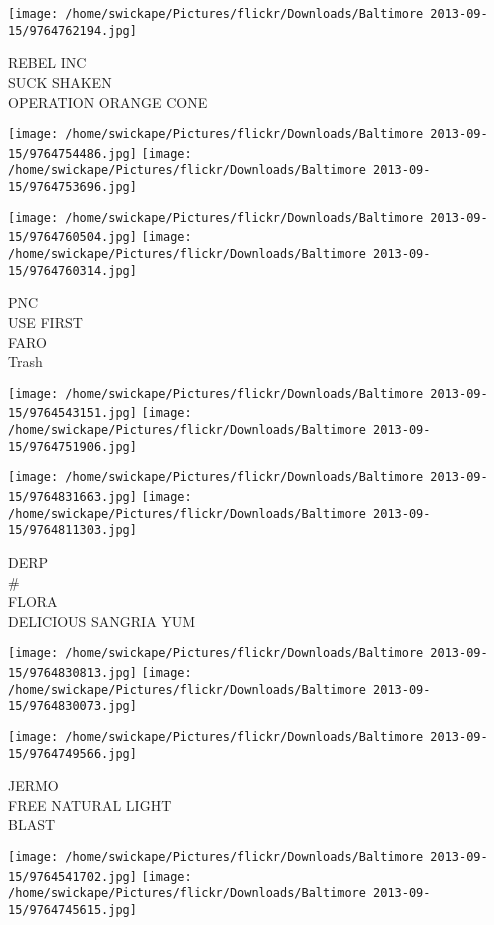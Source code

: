 \documentclass[10pt,letterpaper]{article}
\begin{document}
\vspace{0.25in}
\texttt{[image: /home/swickape/Pictures/flickr/Downloads/Baltimore 2013-09-15/9764762194.jpg]}

REBEL INC\\
SUCK SHAKEN\\
OPERATION ORANGE CONE
\pagebreak

\texttt{[image: /home/swickape/Pictures/flickr/Downloads/Baltimore 2013-09-15/9764754486.jpg]}
\texttt{[image: /home/swickape/Pictures/flickr/Downloads/Baltimore 2013-09-15/9764753696.jpg]}

\texttt{[image: /home/swickape/Pictures/flickr/Downloads/Baltimore 2013-09-15/9764760504.jpg]}
\texttt{[image: /home/swickape/Pictures/flickr/Downloads/Baltimore 2013-09-15/9764760314.jpg]}

PNC\\
USE FIRST\\
FARO\\
Trash
\pagebreak

\texttt{[image: /home/swickape/Pictures/flickr/Downloads/Baltimore 2013-09-15/9764543151.jpg]}
\texttt{[image: /home/swickape/Pictures/flickr/Downloads/Baltimore 2013-09-15/9764751906.jpg]}

\texttt{[image: /home/swickape/Pictures/flickr/Downloads/Baltimore 2013-09-15/9764831663.jpg]}
\texttt{[image: /home/swickape/Pictures/flickr/Downloads/Baltimore 2013-09-15/9764811303.jpg]}

DERP\\
\#\\
FLORA\\
DELICIOUS SANGRIA YUM
\pagebreak

\texttt{[image: /home/swickape/Pictures/flickr/Downloads/Baltimore 2013-09-15/9764830813.jpg]}
\texttt{[image: /home/swickape/Pictures/flickr/Downloads/Baltimore 2013-09-15/9764830073.jpg]}

\vspace{0.25in}
\texttt{[image: /home/swickape/Pictures/flickr/Downloads/Baltimore 2013-09-15/9764749566.jpg]}

JERMO\\
FREE NATURAL LIGHT\\
BLAST
\pagebreak

\texttt{[image: /home/swickape/Pictures/flickr/Downloads/Baltimore 2013-09-15/9764541702.jpg]}
\texttt{[image: /home/swickape/Pictures/flickr/Downloads/Baltimore 2013-09-15/9764745615.jpg]}
\end{document}
